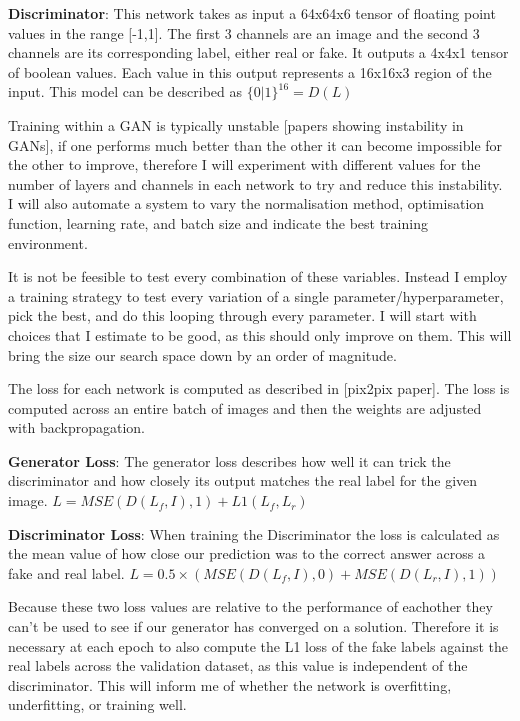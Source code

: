 \documentclass{UoYCSproject}
\begin{document}
\textbf{Discriminator}: This network takes as input a 64x64x6 tensor of floating point values in the range [-1,1]. The first 3 channels are an image and the second 3 channels are its corresponding label, either real or fake.
It outputs a 4x4x1 tensor of boolean values. Each value in this output represents a 16x16x3 region of the input.
This model can be described as $ \{0|1\}^{16} = D(L) $

Training within a GAN is typically unstable [papers showing instability in GANs], if one performs much better than the other it can become impossible for the other to improve, therefore I will experiment with different values for the number of layers and channels in each network to try and reduce this instability. I will also automate a system to vary the normalisation method, optimisation function, learning rate, and batch size and indicate the best training environment.

It is not be feesible to test every combination of these variables. Instead I employ a training strategy to test every variation of a single parameter/hyperparameter, pick the best, and do this looping through every parameter. I will start with choices that I estimate to be good, as this should only improve on them. This will bring the size our search space down by an order of magnitude.  

The loss for each network is computed as described in [pix2pix paper]. The loss is computed across an entire batch of images and then the weights are adjusted with backpropagation.

\textbf{Generator Loss}:
The generator loss describes how well it can trick the discriminator and how closely its output matches the real label for the given image.
$ L = MSE( D(L_{f}, I), 1 ) + L1(L_{f}, L_{r}) $

\textbf{Discriminator Loss}: When training the Discriminator the loss is calculated as the mean value of how close our prediction was to the correct answer across a fake and real label.
$ L = 0.5 \times  ( MSE( D( L_{f}, I ), 0) + MSE( D( L_{r}, I ), 1) ) $

Because these two loss values are relative to the performance of eachother they can't be used to see if our generator has converged on a solution. Therefore it is necessary at each epoch to also compute the L1 loss of the fake labels against the real labels across the validation dataset, as this value is independent of the discriminator. This will inform me of whether the network is overfitting, underfitting, or training well. 
\end{document}
